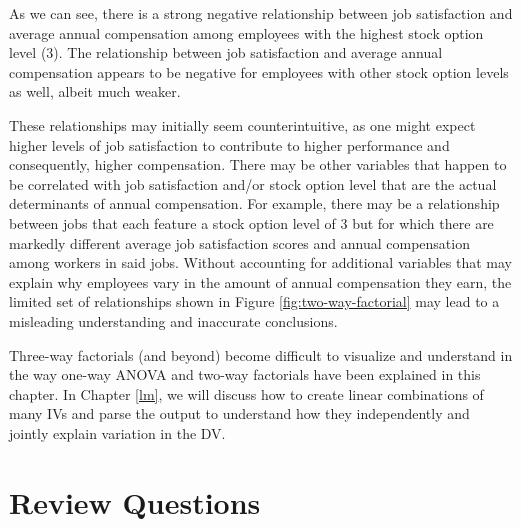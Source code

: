 \documentclass[
]{book}
\begin{document}
As we can see, there is a strong negative relationship between job satisfaction and average annual compensation among employees with the highest stock option level (3). The relationship between job satisfaction and average annual compensation appears to be negative for employees with other stock option levels as well, albeit much weaker.

These relationships may initially seem counterintuitive, as one might expect higher levels of job satisfaction to contribute to higher performance and consequently, higher compensation. There may be other variables that happen to be correlated with job satisfaction and/or stock option level that are the actual determinants of annual compensation. For example, there may be a relationship between jobs that each feature a stock option level of 3 but for which there are markedly different average job satisfaction scores and annual compensation among workers in said jobs. Without accounting for additional variables that may explain why employees vary in the amount of annual compensation they earn, the limited set of relationships shown in Figure \ref{fig:two-way-factorial} may lead to a misleading understanding and inaccurate conclusions.

Three-way factorials (and beyond) become difficult to visualize and understand in the way one-way ANOVA and two-way factorials have been explained in this chapter. In Chapter \ref{lm}, we will discuss how to create linear combinations of many IVs and parse the output to understand how they independently and jointly explain variation in the DV.

\hypertarget{review-questions-7}{%
\section{Review Questions}\label{review-questions-7}}
\end{document}
